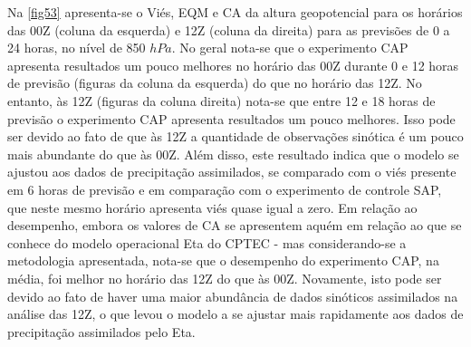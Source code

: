 Na \autoref{fig53} apresenta-se o Viés, EQM e CA da altura geopotencial para os horários das 00Z (coluna da esquerda) e 12Z (coluna da direita) para as previsões de 0 a 24 horas, no nível de 850 $hPa$. No geral nota-se que o experimento CAP apresenta resultados um pouco melhores no horário das 00Z durante 0 e 12 horas de previsão (figuras da coluna da esquerda) do que no horário das 12Z. No entanto, às 12Z (figuras da coluna direita) nota-se que entre 12 e 18 horas de previsão o experimento CAP apresenta resultados um pouco melhores. Isso pode ser devido ao fato de que às 12Z a quantidade de observações sinótica é um pouco mais abundante do que às 00Z. Além disso, este resultado indica que o modelo se ajustou aos dados de precipitação assimilados, se comparado com o viés presente em 6 horas de previsão e em comparação com o experimento de controle SAP, que neste mesmo horário apresenta viés quase igual a zero. Em relação ao desempenho, embora os valores de CA se apresentem aquém em relação ao que se conhece do modelo operacional Eta do CPTEC - mas considerando-se a metodologia apresentada, nota-se que o desempenho do experimento CAP, na média, foi melhor no horário das 12Z do que às 00Z. Novamente, isto pode ser devido ao fato de haver uma maior abundância de dados sinóticos assimilados na análise das 12Z, o que levou o modelo a se ajustar mais rapidamente aos dados de precipitação assimilados pelo Eta.

